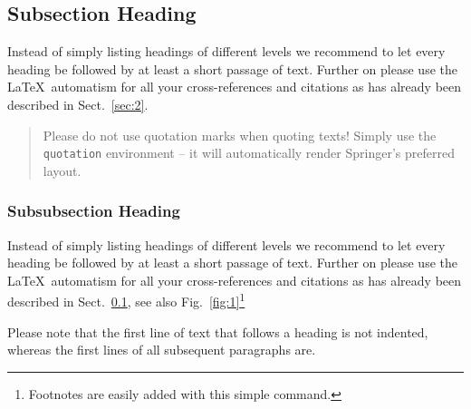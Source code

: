 \subsection{Subsection Heading}
\label{subsec:2}
Instead of simply listing headings of different levels we recommend to
let every heading be followed by at least a short passage of text.
Further on please use the \LaTeX\ automatism for all your
cross-references and citations
as has already been described in Sect.~\ref{sec:2}.

\begin{quotation}
Please do not use quotation marks when quoting texts! Simply use the \verb|quotation| environment -- it will automatically render Springer's preferred layout.
\end{quotation}


\subsubsection{Subsubsection Heading}
Instead of simply listing headings of different levels we recommend to
let every heading be followed by at least a short passage of text.
Further on please use the \LaTeX\ automatism for all your
cross-references and citations as has already been described in
Sect.~\ref{subsec:2}, see also Fig.~\ref{fig:1}\footnote{Footnotes are easily added with this simple command.}

Please note that the first line of text that follows a heading is not indented, whereas the first lines of all subsequent paragraphs are.

